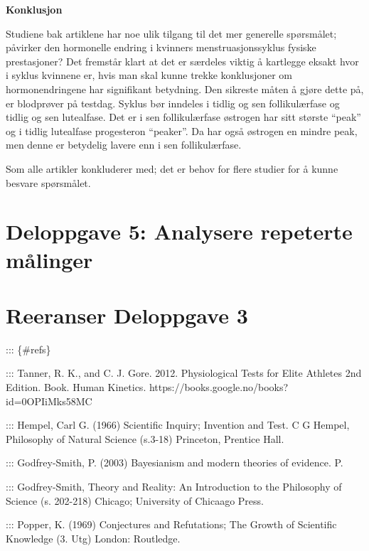 \documentclass[
  letterpaper,
  DIV=11,
  numbers=noendperiod]{scrreprt}
\begin{document}
\textbf{Konklusjon}

Studiene bak artiklene har noe ulik tilgang til det mer generelle
spørsmålet; påvirker den hormonelle endring i kvinners
menstruasjonssyklus fysiske prestasjoner? Det fremstår klart at det er
særdeles viktig å kartlegge eksakt hvor i syklus kvinnene er, hvis man
skal kunne trekke konklusjoner om hormonendringene har signifikant
betydning. Den sikreste måten å gjøre dette på, er blodprøver på
testdag. Syklus bør inndeles i tidlig og sen follikulærfase og tidlig og
sen lutealfase. Det er i sen follikulærfase østrogen har sitt største
``peak'' og i tidlig lutealfase progesteron ``peaker''. Da har også
østrogen en mindre peak, men denne er betydelig lavere enn i sen
follikulærfase.

Som alle artikler konkluderer med; det er behov for flere studier for å
kunne besvare spørsmålet.


\hypertarget{deloppgave-5-analysere-repeterte-muxe5linger}{%
\chapter{Deloppgave 5: Analysere repeterte
målinger}\label{deloppgave-5-analysere-repeterte-muxe5linger}}


\hypertarget{reeranser-deloppgave-3}{%
\chapter{Reeranser Deloppgave 3}\label{reeranser-deloppgave-3}}

::: \{\#refs\}

::: Tanner, R. K., and C. J. Gore. 2012. Physiological Tests for Elite
Athletes 2nd Edition. Book. Human Kinetics.
https://books.google.no/books?id=0OPIiMks58MC

::: Hempel, Carl G. (1966) Scientific Inquiry; Invention and Test.
\textbar{} C G Hempel, Philosophy of Natural Science (s.3-18) Princeton,
Prentice Hall.

::: Godfrey-Smith, P. (2003) Bayesianism and modern theories of
evidence. \textbar{} P.

::: Godfrey-Smith, Theory and Reality: An Introduction to the Philosophy
of Science (s. 202-218) Chicago; University of Chicaago Press.

::: Popper, K. (1969) Conjectures and Refutations; The Growth of
Scientific Knowledge (3. Utg) London: Routledge.
\end{document}
